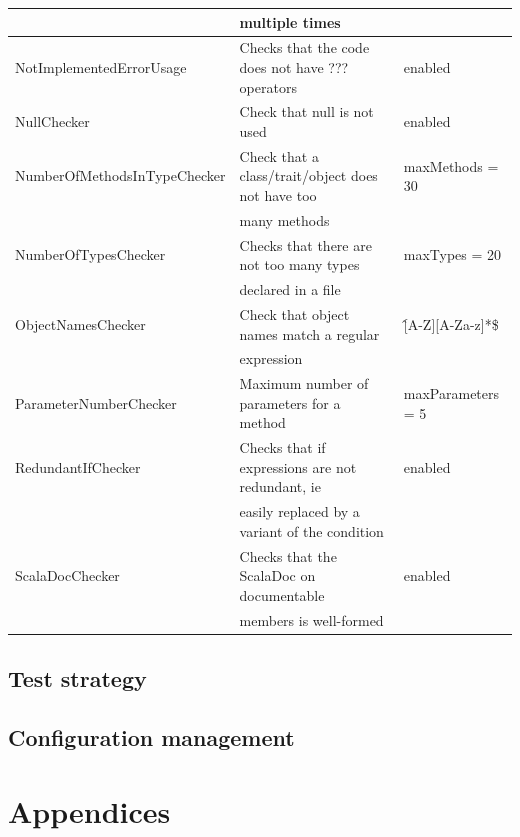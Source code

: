 \documentclass{report}
\begin{document}
\begin{center}
\begin{longtable}{|l|l|l|}
& \small{multiple times} & \\
\hline
\small{NotImplementedErrorUsage} & \small{Checks that the code does not have ??? operators} & enabled \\
\hline
NullChecker & \small{Check that null is not used} & enabled \\
\hline
\small{NumberOfMethodsInTypeChecker} & \small{Check that a class/trait/object does not have too} & maxMethods = 30 \\
& \small{many methods} & \\
\hline
NumberOfTypesChecker & \small{Checks that there are not too many types} & maxTypes = 20 \\
& \small{declared in a file} & \\
\hline
ObjectNamesChecker & \small{Check that object names match a regular}  & \^[A-Z][A-Za-z]*\$ \\
& \small{expression} & \\
\hline
ParameterNumberChecker & \small{Maximum number of parameters for a method} & maxParameters = 5 \\
\hline
RedundantIfChecker & \small{Checks that if expressions are not redundant, ie} & enabled \\
& \small{easily replaced by a variant of the condition} &  \\
\hline
ScalaDocChecker & \small{Checks that the ScalaDoc on documentable}  & enabled \\
& \small{members is well-formed} & \\
\hline
\end{longtable} 
\end{center}
\renewcommand{\arraystretch}{1}
\section{Test strategy}

\paragraph{}
\hspace{4mm}\textnormal{}

\section{Configuration management}

\paragraph{}
\hspace{4mm}\textnormal{}

\chapter{Appendices}
\end{document}
